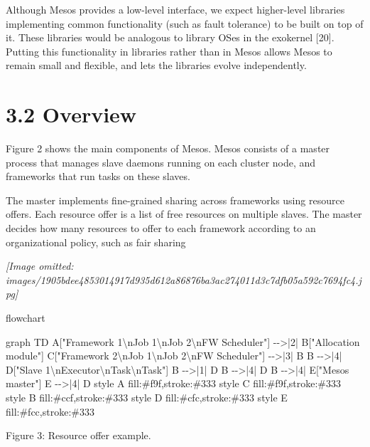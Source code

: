 \documentclass[
]{article}
\newenvironment{Shaded}{}{}
\newcommand{\NormalTok}[1]{#1}
\begin{document}
Although Mesos provides a low-level interface, we expect higher-level
libraries implementing common functionality (such as fault tolerance) to
be built on top of it. These libraries would be analogous to library
OSes in the exokernel {[}20{]}. Putting this functionality in libraries
rather than in Mesos allows Mesos to remain small and flexible, and lets
the libraries evolve independently.

\section{3.2 Overview}\label{overview}

Figure 2 shows the main components of Mesos. Mesos consists of a master
process that manages slave daemons running on each cluster node, and
frameworks that run tasks on these slaves.

The master implements fine-grained sharing across frameworks using
resource offers. Each resource offer is a list of free resources on
multiple slaves. The master decides how many resources to offer to each
framework according to an organizational policy, such as fair sharing

\textit{[Image omitted: images/1905bdee4853014917d935d612a86876ba3ac274011d3c7dfb05a592c7694fc4.jpg]}

flowchart

\begin{Shaded}
\begin{Highlighting}[]
\NormalTok{graph TD}
\NormalTok{    A["Framework 1\textbackslash{}nJob 1\textbackslash{}nJob 2\textbackslash{}nFW Scheduler"] {-}{-}\textgreater{}|2| B["Allocation module"]}
\NormalTok{    C["Framework 2\textbackslash{}nJob 1\textbackslash{}nJob 2\textbackslash{}nFW Scheduler"] {-}{-}\textgreater{}|3| B}
\NormalTok{    B {-}{-}\textgreater{}|4| D["Slave 1\textbackslash{}nExecutor\textbackslash{}nTask\textbackslash{}nTask"]}
\NormalTok{    B {-}{-}\textgreater{}|1| D}
\NormalTok{    B {-}{-}\textgreater{}|4| D}
\NormalTok{    B {-}{-}\textgreater{}|4| E["Mesos master"]}
\NormalTok{    E {-}{-}\textgreater{}|4| D}
\NormalTok{    style A fill:\#f9f,stroke:\#333}
\NormalTok{    style C fill:\#f9f,stroke:\#333}
\NormalTok{    style B fill:\#ccf,stroke:\#333}
\NormalTok{    style D fill:\#cfc,stroke:\#333}
\NormalTok{    style E fill:\#fcc,stroke:\#333}
\end{Highlighting}
\end{Shaded}

Figure 3: Resource offer example.
\end{document}
